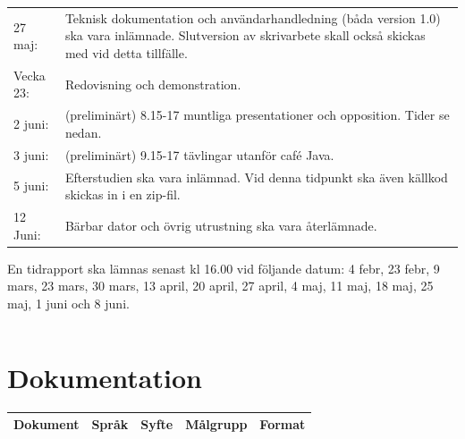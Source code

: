 \documentclass[11pt]{article}
\begin{document}
\begin{flushleft}
\begin{center}
\begin{longtable}{l p{.8\linewidth} }
27 maj: &
Teknisk dokumentation och användarhandledning (båda version 1.0) ska vara inlämnade. Slutversion av skrivarbete skall också skickas med vid detta tillfälle. \\

Vecka 23: &
Redovisning och demonstration.\\

2 juni: &
(preliminärt) 8.15-17 muntliga presentationer och opposition. Tider se nedan. \\

3 juni: &
(preliminärt) 9.15-17 tävlingar utanför café Java. \\

5 juni: &
Efterstudien ska vara inlämnad. Vid denna tidpunkt ska även källkod skickas in i en zip-fil. \\

12 Juni: &
Bärbar dator och övrig utrustning ska vara återlämnade.
\end{longtable}
\end{center}
En tidrapport ska lämnas senast kl 16.00 vid följande datum: 4 febr, 23 febr, 9 mars, 23 mars, 30 mars, 13 april, 20 april, 27 april, 4 maj, 11 maj, 18 maj, 25 maj, 1 juni och 8 juni.


\begin{center}
\begin{longtable}{|l|l|p{.70\linewidth}|l|} \hline

\end{longtable}
\end{center}

\pagebreak

\section{Dokumentation}

\begin{center}
\begin{longtable}{|p{.24\linewidth}|p{.08\linewidth}|p{.25\linewidth}|p{.19\linewidth}|p{.1\linewidth}|}\hline
\textbf{Dokument} & \textbf{Språk} & \textbf{Syfte} & \textbf{Målgrupp} & \textbf{Format} \\ \hline


\end{longtable}
\end{center}
\end{flushleft}
\end{document}
